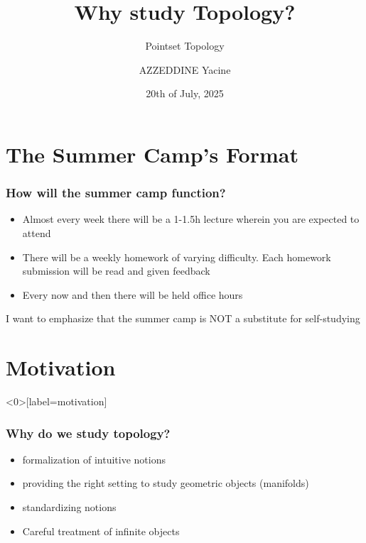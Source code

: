 \documentclass{beamer}
\title{Why study Topology?}
\subtitle{Pointset Topology}
\author{AZZEDDINE Yacine}
\date{20th of July, 2025}
\begin{document}
\maketitle

\section{The Summer Camp's Format}
\begin{frame}
    \frametitle{How will the summer camp function?}

    \begin{itemize}
        \item Almost every week there will be a 1-1.5h lecture wherein you are expected to attend
        \pause
        \item There will be a weekly homework of varying difficulty. Each homework submission
        will be read and given feedback \pause
        \item Every now and then there will be held office hours \pause
    \end{itemize}
    I want to emphasize that the summer camp is NOT a substitute for self-studying
\end{frame}


\section{Motivation}

\begin{frame}<0>[label=motivation]
    \frametitle{Why do we study topology?}

    \begin{itemize}
        \item<1-> formalization of intuitive notions
        \item<2-> providing the right setting to study geometric objects (manifolds)
        \item<3-> standardizing notions 
        \item<4-> Careful treatment of infinite objects
    \end{itemize}

\end{frame}

\end{document}
